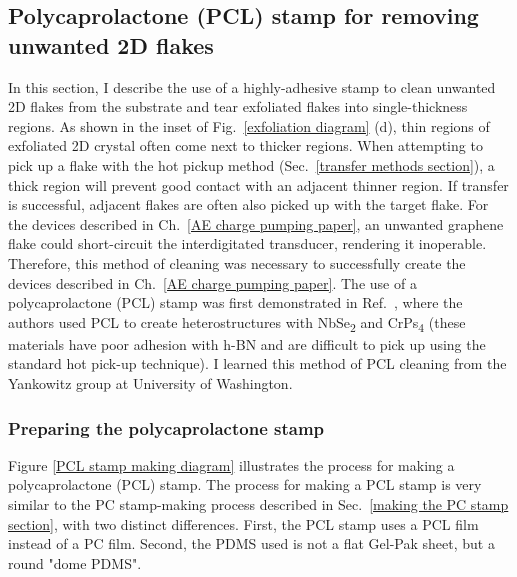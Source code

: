 \documentclass{beavtex_dub_edit}
\begin{document}
\subsection{Polycaprolactone (PCL) stamp for removing unwanted 2D flakes}
In this section, I describe the use of a highly-adhesive stamp to clean unwanted 2D flakes from the substrate and tear exfoliated flakes into single-thickness regions. As shown in the inset of Fig.\ \ref{exfoliation diagram} (d), thin regions of exfoliated 2D crystal often come next to thicker regions. When attempting to pick up a flake with the hot pickup method (Sec.\ \ref{transfer methods section}), a thick region will prevent good contact with an adjacent thinner region. If transfer is successful, adjacent flakes are often also picked up with the target flake. For the devices described in Ch.\ \ref{AE charge pumping paper}, an unwanted graphene flake could short-circuit the interdigitated transducer, rendering it inoperable. Therefore, this method of cleaning was necessary to successfully create the devices described in Ch.\ \ref{AE charge pumping paper}. The use of a polycaprolactone (PCL) stamp was first demonstrated in Ref.\ \cite{son_strongly_2020}, where the authors used PCL to create heterostructures with NbSe\textsubscript{2} and CrPs\textsubscript{4} (these materials have poor adhesion with h-BN and are difficult to pick up using the standard hot pick-up technique). I learned this method of PCL cleaning from the Yankowitz group at University of Washington. 

\subsubsection{Preparing the polycaprolactone stamp}


Figure \ref{PCL stamp making diagram} illustrates the process for making a polycaprolactone (PCL) stamp. The process for making a PCL stamp is very similar to the PC stamp-making process described in Sec.\ \ref{making the PC stamp section}, with two distinct differences. First, the PCL stamp uses a PCL film instead of a PC film. Second, the PDMS used is not a flat Gel-Pak sheet, but a round "dome PDMS". 
\end{document}
